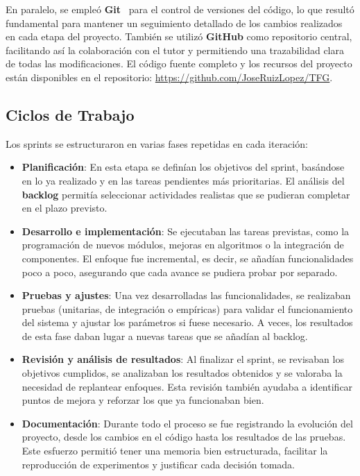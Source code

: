 En paralelo, se empleó \textbf{Git}~\cite{chaconProGit2014} para el control de versiones del código, lo que resultó
fundamental para mantener un seguimiento detallado de los cambios realizados en cada etapa del proyecto.
También se utilizó \textbf{GitHub} como repositorio central, facilitando así la colaboración con el tutor y permitiendo
una trazabilidad clara de todas las modificaciones.
El código fuente completo y los recursos del proyecto están disponibles en el repositorio: \url{https://github.com/JoseRuizLopez/TFG}.


\subsection{Ciclos de Trabajo}\label{subsec:ciclos-de-trabajo}
Los sprints se estructuraron en varias fases repetidas en cada iteración:

\begin{itemize}
    \item \textbf{Planificación}: En esta etapa se definían los objetivos del sprint, basándose en lo ya realizado y en
          las tareas pendientes más prioritarias.
          El análisis del \textbf{backlog} permitía seleccionar actividades realistas que se pudieran completar en el plazo
          previsto.

    \item \textbf{Desarrollo e implementación}: Se ejecutaban las tareas previstas, como la programación de nuevos
          módulos, mejoras en algoritmos o la integración de componentes.
          El enfoque fue incremental, es decir, se añadían funcionalidades poco a poco, asegurando que cada avance se pudiera
          probar por separado.

    \item \textbf{Pruebas y ajustes}: Una vez desarrolladas las funcionalidades, se realizaban pruebas (unitarias, de
          integración o empíricas) para validar el funcionamiento del sistema y ajustar los parámetros si fuese necesario.
          A veces, los resultados de esta fase daban lugar a nuevas tareas que se añadían al backlog.

    \item \textbf{Revisión y análisis de resultados}: Al finalizar el sprint, se revisaban los objetivos cumplidos, se
          analizaban los resultados obtenidos y se valoraba la necesidad de replantear enfoques.
          Esta revisión también ayudaba a identificar puntos de mejora y reforzar los que ya funcionaban bien.

    \item \textbf{Documentación}: Durante todo el proceso se fue registrando la evolución del proyecto, desde los
          cambios en el código hasta los resultados de las pruebas.
          Este esfuerzo permitió tener una memoria bien estructurada, facilitar la reproducción de experimentos y justificar cada
          decisión tomada.
\end{itemize}


